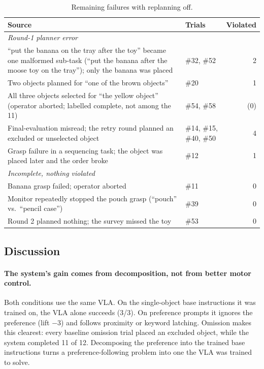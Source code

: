 \begin{table}[t]
  \centering
  \caption{Remaining failures with replanning off.}
  \label{tab:pref-failures}
  \begin{tabularx}{\linewidth}{Xlr}
    \toprule
    Source & Trials & Violated \\
    \midrule
    \multicolumn{3}{l}{\textit{Round-1 planner error}} \\
    \quad ``put the banana on the tray after the toy'' became one malformed sub-task
      (``put the banana after the moose toy on the tray''); only the banana was placed
      & \#32, \#52 & 2 \\
    \quad Two objects planned for ``one of the brown objects'' & \#20 & 1 \\
    \quad All three objects selected for ``the yellow object'' (operator aborted; labelled
      complete, not among the 11) & \#54, \#58 & (0) \\
    \midrule
    Final-evaluation misread; the retry round planned an excluded or unselected object
      & \#14, \#15, \#40, \#50 & 4 \\
    \midrule
    Grasp failure in a sequencing task; the object was placed later and the order broke
      & \#12 & 1 \\
    \midrule
    \multicolumn{3}{l}{\textit{Incomplete, nothing violated}} \\
    \quad Banana grasp failed; operator aborted & \#11 & 0 \\
    \quad Monitor repeatedly stopped the pouch grasp (``pouch'' vs.\ ``pencil case'')
      & \#39 & 0 \\
    \quad Round 2 planned nothing; the survey missed the toy & \#53 & 0 \\
    \bottomrule
  \end{tabularx}
\end{table}

\subsection{Discussion}

\paragraph{The system's gain comes from decomposition, not from better motor control.}
Both conditions use the same VLA. On the single-object base instructions it was trained
on, the VLA alone succeeds (3/3). On preference prompts it ignores the preference (lift
$-3$) and follows proximity or keyword latching. Omission makes this clearest: every
baseline omission trial placed an excluded object, while the system completed 11 of 12.
Decomposing the preference into the trained base instructions turns a
preference-following problem into one the VLA was trained to solve.

